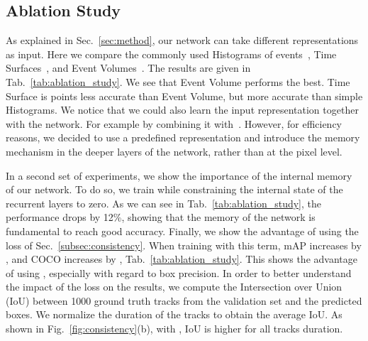 \documentclass{article}
\begin{document}
\subsection{Ablation Study}
\label{subsec:ablation_study}
As explained in Sec.~\ref{sec:method}, our network can take different representations as input. Here we compare the commonly used Histograms of events~\cite{moeys2016steering,maqueda2018event}, Time Surfaces~\cite{lagorce2016hots}, and Event Volumes~\cite{zhu2019unsupervised}. The results are given in Tab.~\ref{tab:ablation_study}. We see that Event Volume performs the best. Time Surface is  points less accurate than Event Volume, but more accurate than simple Histograms. We notice that we could also learn the input representation  together with the network. For example by combining it with~\cite{cannici2020matrix,tulyakov2019learning,gehrig2019end}. However, for efficiency reasons, we decided to use a predefined representation and introduce the memory mechanism in the deeper layers of the network, rather than at the pixel level.

In a second set of experiments, we show the importance of the internal memory of our network.
To do so, we train while constraining the internal state of the recurrent layers to zero. 
As we can see in Tab.~\ref{tab:ablation_study}, the performance drops by 12\%, showing that the memory of the network is fundamental to reach good accuracy.
Finally, we show the advantage of using the loss  of Sec.~\ref{subsec:consistency}.
When training with this term, mAP increases by  , and COCO   increases by  , Tab.~\ref{tab:ablation_study}. This shows the advantage of using , especially with regard to box precision. 
In order to better understand the impact of the loss  on the results, we compute the Intersection over Union (IoU) between 1000 ground truth tracks from the validation set and the predicted boxes. We normalize the duration of the tracks to obtain the average IoU. As shown in Fig.~\ref{fig:consistency}(b), with , IoU is higher for all tracks duration.   
\end{document}
